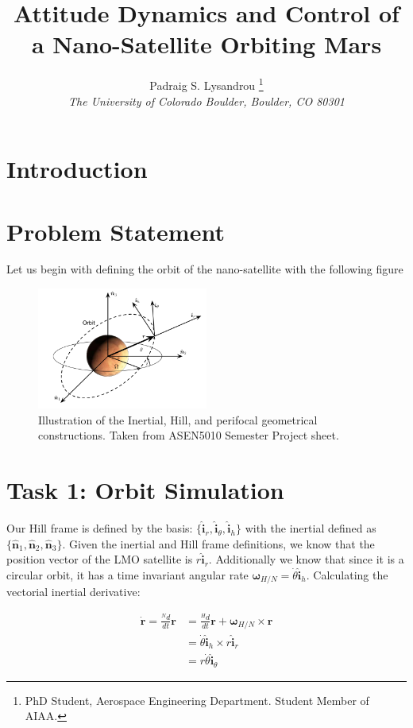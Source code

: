 \documentclass[paper]{aiaaNew}
\title{Attitude Dynamics and Control of a Nano-Satellite Orbiting Mars}
\author{Padraig S. Lysandrou
  \thanks{PhD Student, Aerospace Engineering Department.  Student Member of AIAA.}
  \\
  \emph{\normalsize The University of Colorado Boulder, Boulder, CO 80301}
}
\begin{document}
\maketitle
\clearpage
\section{Introduction}

\section{Problem Statement}
Let us begin with defining the orbit of the nano-satellite with the following figure


\begin{figure}[!htbp] 
  \centering
  \includegraphics[width=0.5\textwidth]{Figures/framedef.PNG}
  \caption{Illustration of the Inertial, Hill, and perifocal geometrical constructions. Taken from ASEN5010 Semester Project sheet.}
  \label{fig:succ}
 \end{figure}



\section*{Task 1: Orbit Simulation}
Our Hill frame is defined by the basis: $\{\bm{\hat{i}}_r, \bm{\hat{i}}_\theta, \bm{\hat{i}}_h \}$ with the inertial defined as $\{\bm{\hat{n}}_1, \bm{\hat{n}}_2, \bm{\hat{n}}_3 \}$. Given the inertial and Hill frame definitions, we know that the position vector of the LMO satellite is $r\bm{\hat{i}}_r$. Additionally we know that since it is a circular orbit, it has a time invariant angular rate ${\bm{\omega}}_{H/N} = \dot{\theta}\mathbf{\hat{i}}_h$. Calculating the vectorial inertial derivative:

\begin{align}
	\dot{\bm{r}} = \frac{^N d}{dt}\bm{r} &= \frac{^H d}{dt}\bm{r} + \bm{\omega}_{H/N} \times \bm{r} \\
	&= \dot{\theta}\bm{\hat{i}}_h \times r\bm{\hat{i}}_r \\
	&= r\dot{\theta} \bm{\hat{i}}_\theta
\end{align}
\end{document}
